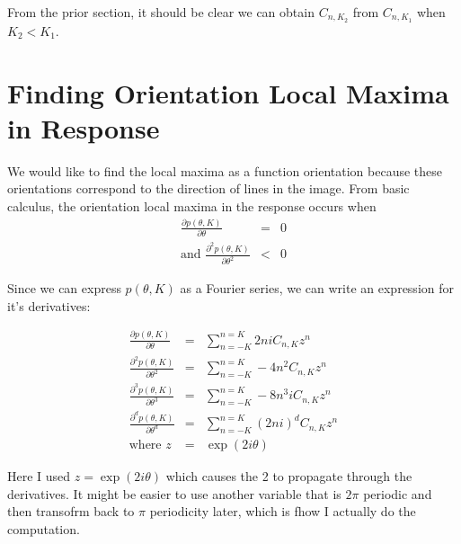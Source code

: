 \documentclass{article}
\begin{document}
From the prior section, it should be clear we can obtain $ C_{n,K_2} $ from $ C_{n,K_1} $ when $ K_2 < K_1 $. 

\section{Finding Orientation Local Maxima in Response}

We would like to find the local maxima as a function orientation because these orientations correspond to the direction of lines in the image. From basic calculus, the orientation local maxima in the response occurs when
\begin{eqnarray}
	\frac{\partial p(\theta,K)}{\partial \theta} & = & 0 \\
	\mbox{and } \frac{\partial^2 p(\theta,K)}{\partial \theta^2} & < & 0
\end{eqnarray}

Since we can express $ p(\theta,K) $ as a Fourier series, we can write an expression for it's derivatives:

\begin{eqnarray}
	\frac{\partial p(\theta,K)}{\partial \theta} & = & \sum_{n=-K}^{n=K} 2 n i C_{n,K} z^n \\
	\frac{\partial^2 p(\theta,K)}{\partial \theta^2} & = & \sum_{n=-K}^{n=K} - 4 n^2 C_{n,K} z^n \\
	\frac{\partial^3 p(\theta,K)}{\partial \theta^3} & = & \sum_{n=-K}^{n=K} - 8 n^3 i C_{n,K} z^n \\
	\frac{\partial^d p(\theta,K)}{\partial \theta^d} & = & \sum_{n=-K}^{n=K} (2ni)^d C_{n,K} z^n \\
	\mbox{where } z & = & \exp(2i\theta)
\end{eqnarray}

{\color{red} Here I used $ z = \exp(2i\theta) $ which causes the 2 to propagate through the derivatives. It might be easier to use another variable that is $ 2 \pi $ periodic and then transofrm back to $ \pi $ periodicity later, which is fhow I actually do the computation.}
\end{document}
